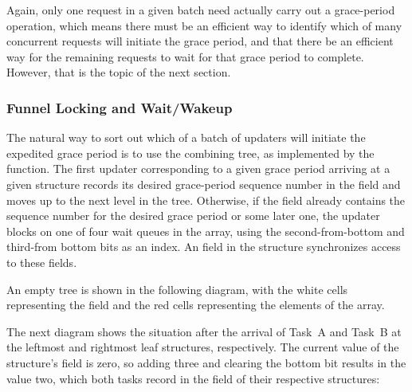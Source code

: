 Again, only one request in a given batch need actually carry out a
grace-period operation, which means there must be an efficient way to
identify which of many concurrent requests will initiate the grace
period, and that there be an efficient way for the remaining requests to
wait for that grace period to complete.
However, that is the topic of
the next section.

\subsubsection{Funnel Locking and Wait/Wakeup}

The natural way to sort out which of a batch of updaters will initiate
the expedited grace period is to use the  combining tree, as
implemented by the  function.
The first updater
corresponding to a given grace period arriving at a given 
structure records its desired grace-period sequence number in the
 field and moves up to the next level in the tree.
Otherwise, if the  field already contains the sequence
number for the desired grace period or some later one, the updater
blocks on one of four wait queues in the  array, using the
second-from-bottom and third-from bottom bits as an index.
An
 field in the  structure synchronizes access
to these fields.

An empty  tree is shown in the following diagram, with the
white cells representing the  field and the red cells
representing the elements of the  array.

\begin{center}
\end{center}

The next diagram shows the situation after the arrival of Task~A and
Task~B at the leftmost and rightmost leaf  structures,
respectively.
The current value of the  structure's
 field is zero, so adding three and clearing the
bottom bit results in the value two, which both tasks record in the
 field of their respective  structures:


